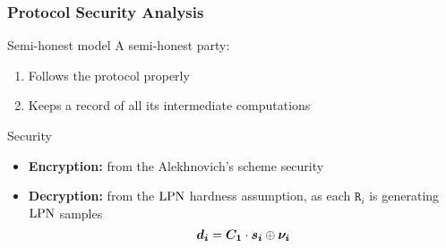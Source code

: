 \begin{frame}
 \frametitle{Protocol Security Analysis }

  \begin{block}{Semi-honest model}
    A semi-honest party:
    \begin{enumerate}
      \item Follows the protocol properly
      \item Keeps a record of all its intermediate computations
    \end{enumerate}
  \end{block}

  \begin{block}{Security}
  \begin{itemize}
    \item \textbf{Encryption:} from the Alekhnovich's scheme security
    \item \textbf{Decryption:} from the $\mathrm{LPN}$ hardness assumption, as each $\mathtt{R}_i$ is generating $\mathrm{LPN}$ samples
    \[
     \boldsymbol{d_i} = \boldsymbol{C_1} \cdot \boldsymbol{s_i} \mathbin{\oplus} \boldsymbol{\nu_{i}} 
    \]

  \end{itemize}
  \end{block}
  
\end{frame}

